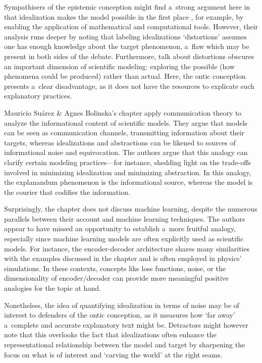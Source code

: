 Sympathisers of the epistemic conception might find a~strong argument here in that idealization makes the model possible in the first place
\parencite[][p.57]{cassini_models_2021}, %
 for example, by enabling the application of mathematical and computational tools. However, their analysis runs deeper by noting that labeling idealizations ‘distortions' assumes one has enough knowledge about the target phenomenon, a~flaw which may be present in both sides of the debate. Furthermore, talk about distortions obscures an important dimension of scientific modeling: exploring the possible (how phenomena could be produced) rather than actual. Here, the ontic conception presents a~clear disadvantage, as it does not have the resources to explicate such explanatory practices.

Mauricio Suárez \& Agnes Bolinska's chapter apply communication theory to analyze the informational content of scientific models. They argue that models can be seen as communication channels, transmitting information about their targets, whereas idealizations and abstractions can be likened to sources of informational noise and equivocation. The authors argue that this analogy can clarify certain modeling practices---for instance, shedding light on the trade-offs involved in minimizing idealization and minimizing abstraction. In this analogy, the explanandum phenomenon is the informational source, whereas the model is the courier that codifies the information.

Surprisingly, the chapter does not discuss machine learning, despite the numerous parallels between their account and machine learning techniques. The authors appear to have missed an opportunity to establish a~more fruitful analogy, especially since machine learning models are often explicitly used as scientific models. For instance, the encoder-decoder architecture shares many similarities with the examples discussed in the chapter and is often employed in physics' simulations. In these contexts, concepts like loss functions, noise, or the dimensionality of encoder/decoder can provide more meaningful positive analogies for the topic at hand.

Nonetheless, the idea of quantifying idealization in terms of noise may be of interest to defenders of the ontic conception, as it measures how ‘far away' a~complete and accurate explanatory text might be. Detractors might however note that this overlooks the fact that idealizations often enhance the representational relationship between the model and target by sharpening the focus on what is of interest and ‘carving the world' at the right seams.


